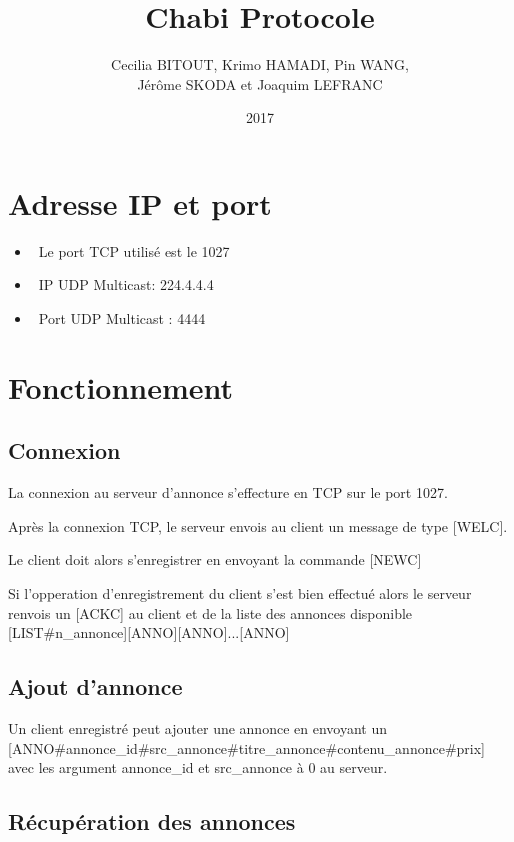 \documentclass[12pt]{article}
\title{Chabi Protocole}
\author{
  Cecilia BITOUT, Krimo HAMADI, Pin WANG, \\
  Jérôme SKODA et Joaquim LEFRANC
}
\date{2017}
\begin{document}
\maketitle

\newcommand{\separator}{\#}

\section{Adresse IP et port}

\begin{itemize}
  \item~Le port TCP utilisé est le 1027
  \item~IP UDP Multicast: 224.4.4.4
  \item~Port UDP Multicast : 4444
\end{itemize}


\section{Fonctionnement}

\subsection{Connexion}

La connexion au serveur d'annonce s'effecture en TCP sur le port 1027.

Après la connexion TCP, le serveur envois au client un message de type [WELC].

Le client doit alors s'enregistrer en envoyant la commande [NEWC]

Si l'opperation d'enregistrement du client s'est bien effectué alors le serveur renvois un [ACKC] au client et de la liste des annonces disponible [LIST\separator{}n\_annonce][ANNO][ANNO]...[ANNO]


\subsection{Ajout d'annonce}

Un client enregistré peut ajouter une annonce en envoyant un [ANNO\separator{}annonce\_id\separator{}src\_annonce\separator{}titre\_annonce\separator{}contenu\_annonce\separator{}prix] avec les argument annonce\_id et src\_annonce à 0 au serveur.


\subsection{Récupération des annonces}
\end{document}
